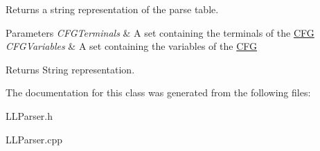 Returns a string representation of the parse table. 


\begin{DoxyParams}{Parameters}
{\em C\-F\-G\-Terminals} & A set containing the terminals of the \hyperlink{class_c_f_g}{C\-F\-G} \\
\hline
{\em C\-F\-G\-Variables} & A set containing the variables of the \hyperlink{class_c_f_g}{C\-F\-G}\\
\hline
\end{DoxyParams}
\begin{DoxyReturn}{Returns}
String representation. 
\end{DoxyReturn}


The documentation for this class was generated from the following files\-:\begin{DoxyCompactItemize}
\item 
L\-L\-Parser.\-h\item 
L\-L\-Parser.\-cpp\end{DoxyCompactItemize}

